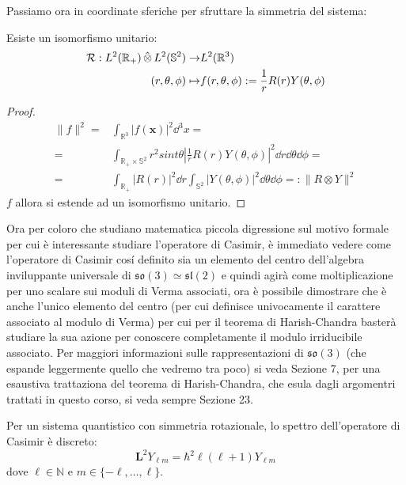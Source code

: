Passiamo ora in coordinate sferiche per sfruttare la simmetria del sistema:
\begin{lemma}
    Esiste un isomorfismo unitario: 
\begin{align*}
\mathcal{R} :   L^2(\mathbb{R}_+) \operatorname{\hat{\otimes}} L^2(\mathbb{S}^2) \to& L^2(\mathbb{R}^3) \\ 
(r, \theta, \phi) \mapsto& f(r,\theta, \phi) := \dfrac{1}{r}R(r)Y(\theta, \phi)
\end{align*}
\end{lemma}

\begin{proof}
    \begin{align*}
    \|f\|^2=& \int_{\mathbb{R}^3} |f(\mathbf{x})|^2 \dd^3 x = \\
 =& \int_{\mathbb{R}_+ \times \mathbb{S}^2}r^2sint \theta \left| \frac{1}{r}R(r) Y (\theta, \phi)\right|^2 \dd r \dd \theta \dd \phi =\\ 
 =&  \int_{\mathbb{R}_+} |R(r)|^2 \dd r \int_{\mathbb{S}^2} |Y(\theta, \phi)|^2 \dd \theta \dd \phi =: \|R \otimes Y\|^2
    \end{align*}
 $f$ allora si estende ad un isomorfismo unitario. 
\end{proof}


Ora per coloro che studiano matematica piccola digressione sul motivo formale per cui è interessante studiare l'operatore di Casimir, è immediato vedere come l'operatore di Casimir cosí definito sia un elemento del centro dell'algebra inviluppante universale di $\mathfrak{so}(3)\simeq \mathfrak{sl}(2)$ e quindi agirà come moltiplicazione per uno scalare sui moduli di Verma associati, ora è possibile dimostrare che è anche l'unico elemento del centro (per cui definisce univocamente il carattere associato al modulo di Verma) per cui per il teorema di Harish-Chandra basterà studiare la sua azione per conoscere completamente il modulo irriducibile associato. Per maggiori informazioni sulle rappresentazioni di $\mathfrak{so}(3)$ (che espande leggermente quello che vedremo tra poco) si veda \cite{Humphreys} Sezione 7, per una esaustiva trattaziona del teorema di Harish-Chandra, che esula dagli argomentri trattati in questo corso, si veda sempre \cite{Humphreys} Sezione 23. 


Per un sistema quantistico con simmetria rotazionale, lo spettro dell'operatore di Casimir è discreto:
\begin{equation*}
\mathbf{L}^2 Y_{\ell m} = \hbar^2 \ell(\ell+1) Y_{\ell m}
\end{equation*}
dove $\ell \in \mathbb{N}$ e $m \in \{-\ell, \dots, \ell\}$.

